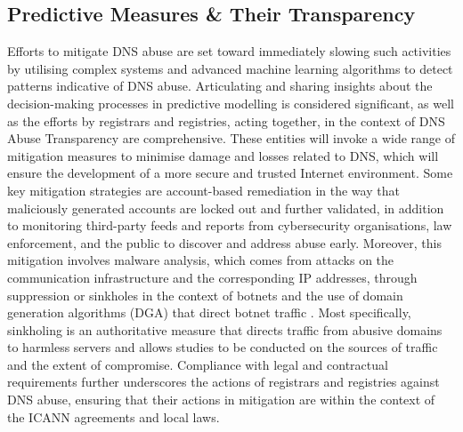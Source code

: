 \subsection{Predictive Measures \& Their Transparency}

Efforts to mitigate DNS abuse are set toward immediately slowing such activities by utilising complex systems and advanced machine learning algorithms to detect patterns indicative of DNS abuse. Articulating and sharing insights about the decision-making processes in predictive modelling is considered significant, as well as the efforts by registrars and registries, acting together, in the context of DNS Abuse Transparency are comprehensive. These entities will invoke a wide range of mitigation measures to minimise damage and losses related to DNS, which will ensure the development of a more secure and trusted Internet environment. Some key mitigation strategies are account-based remediation in the way that maliciously generated accounts are locked out and further validated, in addition to monitoring third-party feeds and reports from cybersecurity organisations, law enforcement, and the public to discover and address abuse early. Moreover, this mitigation involves malware analysis, which comes from attacks on the communication infrastructure and the corresponding IP addresses, through suppression or sinkholes in the context of botnets and the use of domain generation algorithms (DGA) that direct botnet traffic \cite{ M3AAWG2024}. Most specifically, sinkholing is an authoritative measure that directs traffic from abusive domains to harmless servers and allows studies to be conducted on the sources of traffic and the extent of compromise. Compliance with legal and contractual requirements further underscores the actions of registrars and registries against DNS abuse, ensuring that their actions in mitigation are within the context of the ICANN agreements and local laws. 

